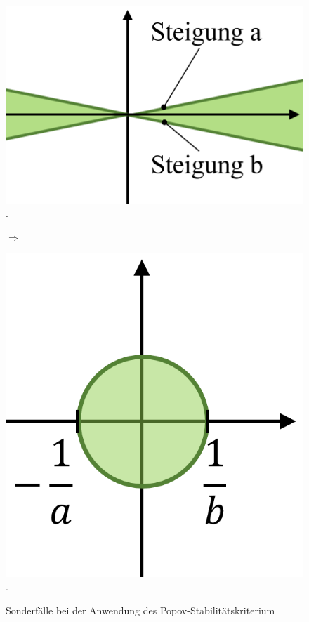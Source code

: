 \begin{figure}[!h]
\begin{minipage}{0.15\linewidth}
	\end{minipage}\hspace{.1\linewidth}
	\begin{minipage}{0.15\linewidth}
		\includegraphics[width=1\linewidth]{./bilder/Popov6.png}.
	\end{minipage}\hspace{0.05\linewidth}$\Rightarrow$\hspace{0.05\linewidth}
	\begin{minipage}{0.15\linewidth}
		\includegraphics[width=1\linewidth]{./bilder/Popov7.png}.
	\end{minipage}	
	\label{fig:PopovSonderfaelle}
	\caption{Sonderfälle bei der Anwendung des Popov-Stabilitätskriterium}
\end{figure}

